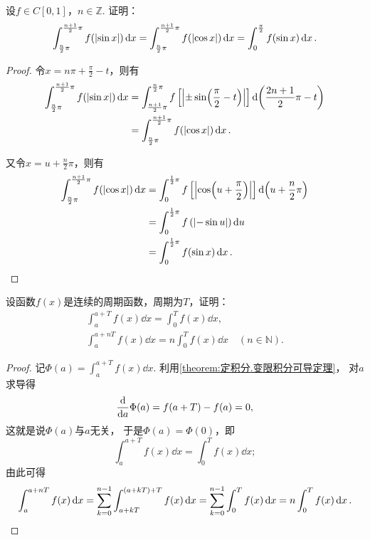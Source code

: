 \begin{example}
设\(f \in C[0,1]\)，\(n\in\mathbb{Z}\).
证明：\begin{equation}
	\int_{\frac{n}{2} \pi}^{\frac{n+1}{2} \pi} f(\abs{\sin x}) \dd{x}
	= \int_{\frac{n}{2} \pi}^{\frac{n+1}{2} \pi} f(\abs{\cos x}) \dd{x}
	= \int_0^{\frac{\pi}{2}} f(\sin x) \dd{x}.
\end{equation}
\def\arraystretch{1.5}
\begin{proof}
令\(x = n\pi+\frac{\pi}{2}-t\)，则有\[
\begin{split}
\int_{\frac{n}{2} \pi}^{\frac{n+1}{2} \pi} f(\abs{\sin x}) \dd{x}
&= \int_{\frac{n+1}{2} \pi}^{\frac{n}{2} \pi} f\left[\abs{\pm\sin(\frac{\pi}{2}-t)}\right] \dd(\frac{2n+1}{2}\pi-t) \\
&= \int_{\frac{n}{2} \pi}^{\frac{n+1}{2} \pi} f(\abs{\cos x}) \dd{x}.
\end{split}
\]

又令\(x=u+\frac{n}{2} \pi\)，则有\[
\begin{split}
\int_{\frac{n}{2} \pi}^{\frac{n+1}{2} \pi} f(\abs{\cos x}) \dd{x}
&= \int_0^{\frac{1}{2}\pi} f\left[ \abs{\cos(u+\frac{\pi}{2})} \right] \dd(u+\frac{n}{2}\pi) \\
&= \int_0^{\frac{1}{2}\pi} f\left( \abs{-\sin u} \right) \dd{u} \\
&= \int_0^{\frac{1}{2}\pi} f(\sin x) \dd{x}.
\qedhere
\end{split}
\]
\end{proof}
\end{example}

\begin{example}
设函数\(f(x)\)是连续的周期函数，周期为\(T\)，证明：
\begin{gather}
	\int_a^{a+T} f(x) \dd{x} = \int_0^T f(x) \dd{x}, \\
	\int_a^{a+nT} f(x)\dd{x} = n\int_0^T f(x)\dd{x}
	\quad(n \in \mathbb{N}).
\end{gather}
\begin{proof}
记\(\Phi(a) = \int_a^{a+T} f(x) \dd{x}\).
利用\cref{theorem:定积分.变限积分可导定理}，
对\(a\)求导得\[
	\dv{a} \Phi(a) = f(a+T) - f(a) = 0,
\]
这就是说\(\Phi(a)\)与\(a\)无关，
于是\(\Phi(a) = \Phi(0)\)，即\[
	\int_a^{a+T} f(x) \dd{x} = \int_0^T f(x) \dd{x};
\]
由此可得\[
	\int_a^{a+nT} f(x)\dd{x}
	= \sum_{k=0}^{n-1} \int_{a+kT}^{(a+kT)+T} f(x) \dd{x}
	= \sum_{k=0}^{n-1} \int_0^T f(x) \dd{x}
	= n \int_0^T f(x) \dd{x}.
	\qedhere
\]
\end{proof}
\end{example}

